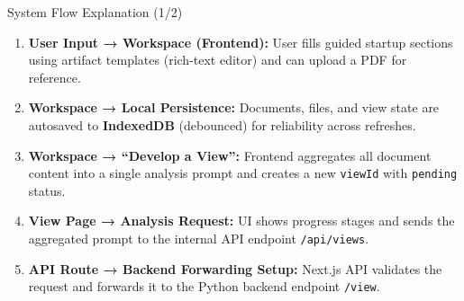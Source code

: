 \documentclass{beamer}
\begin{document}
\begin{frame}{System Flow Explanation (1/2)}
\small
\begin{enumerate}
    \item \textbf{User Input → Workspace (Frontend):}  
    User fills guided startup sections using artifact templates (rich-text editor) and can upload a PDF for reference.

    \item \textbf{Workspace → Local Persistence:}  
    Documents, files, and view state are autosaved to \textbf{IndexedDB} (debounced) for reliability across refreshes.

    \item \textbf{Workspace → “Develop a View”:}  
    Frontend aggregates all document content into a single analysis prompt and creates a new \texttt{viewId} with \texttt{pending} status.

    \item \textbf{View Page → Analysis Request:}  
    UI shows progress stages and sends the aggregated prompt to the internal API endpoint \texttt{/api/views}.

    \item \textbf{API Route → Backend Forwarding Setup:}  
    Next.js API validates the request and forwards it to the Python backend endpoint \texttt{/view}.
\end{enumerate}
\end{frame}
\end{document}
